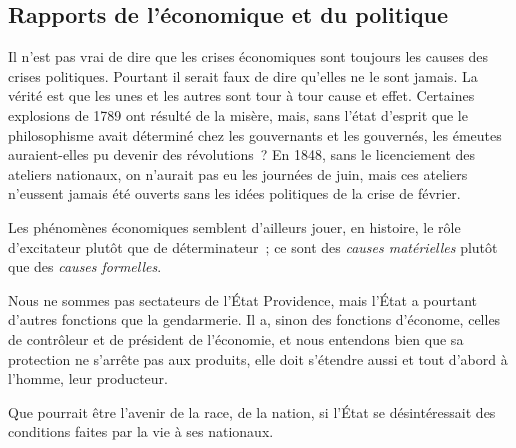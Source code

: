 \documentclass[french,twoside]{book} %
\newcommand{\astermono}{\medskip\centerline{\color{rubric}\large\selectfont{\syms ✻}}\medskip\par}%
\begin{document}
\astermono

\subsection[Rapports de l’économique et du politique]{Rapports de l’économique et du politique}
\noindent Il n’est pas vrai de dire que les crises économiques sont toujours les causes des crises politiques. Pourtant il serait faux de dire qu’elles ne le sont jamais. La vérité est que les unes et les autres sont tour à tour cause et effet. Certaines explosions de 1789 ont résulté de la misère, mais, sans l’état d’esprit que le philosophisme avait déterminé chez les gouvernants et les gouvernés, les émeutes auraient-elles pu devenir des révolutions ? En 1848, sans le licenciement des ateliers nationaux, on n’aurait pas eu les journées de juin, mais ces ateliers n’eussent jamais été ouverts sans les idées politiques de la crise de février.\par
Les phénomènes économiques semblent d’ailleurs jouer, en histoire, le rôle d’excitateur plutôt que de déterminateur ; ce sont des \emph{causes matérielles} plutôt que des \emph{causes formelles}.\par

\astermono

\noindent Nous ne sommes pas sectateurs de l’État Providence, mais l’État a pourtant d’autres fonctions que la gendarmerie. Il a, sinon des fonctions d’économe, celles de contrôleur et de président de l’économie, et nous entendons bien que sa protection ne s’arrête pas aux produits, elle doit s’étendre aussi et tout d’abord à l’homme, leur producteur.\par
Que pourrait être l’avenir de la race, de la nation, si l’État se désintéressait des conditions faites par la vie à ses nationaux.\par

\astermono
\end{document}
